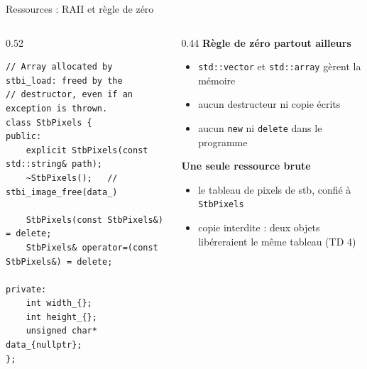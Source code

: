 \documentclass[aspectratio=169,10pt]{beamer}
\newcommand{\code}[1]{\texttt{#1}}
\begin{document}
\begin{frame}[fragile]{Ressources : RAII et règle de zéro}
  \begin{columns}[T]
    \begin{column}{0.52\textwidth}
\begin{lstlisting}
// Array allocated by stbi_load: freed by the
// destructor, even if an exception is thrown.
class StbPixels {
public:
    explicit StbPixels(const std::string& path);
    ~StbPixels();   // stbi_image_free(data_)

    StbPixels(const StbPixels&) = delete;
    StbPixels& operator=(const StbPixels&) = delete;

private:
    int width_{};
    int height_{};
    unsigned char* data_{nullptr};
};
\end{lstlisting}
    \end{column}
    \begin{column}{0.44\textwidth}
      \textbf{Règle de zéro partout ailleurs}
      \begin{itemize}
        \item \code{std::vector} et \code{std::array} gèrent la mémoire
        \item aucun destructeur ni copie écrits
        \item aucun \code{new} ni \code{delete} dans le programme
      \end{itemize}
      \vspace{0.6em}
      \textbf{Une seule ressource brute}
      \begin{itemize}
        \item le tableau de pixels de stb, confié à \code{StbPixels}
        \item copie interdite : deux objets libéreraient le même tableau (TD 4)
      \end{itemize}
    \end{column}
  \end{columns}
\end{frame}
\end{document}
